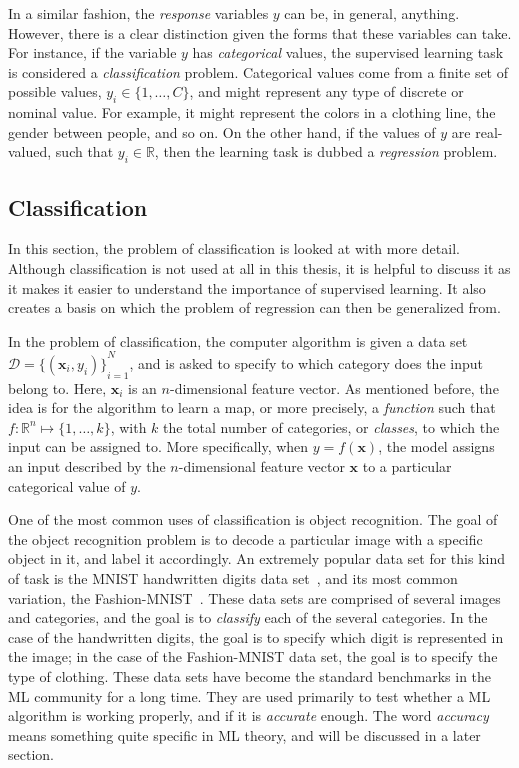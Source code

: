 In a similar fashion, the \emph{response} variables $y$ can be, in general, anything. 
However, there is a clear distinction given the forms that these variables can take. For 
instance, if the variable $y$ has \emph{categorical} values, the supervised learning task 
is considered a \emph{classification} problem. Categorical values come from a finite set of 
possible values, \(y_{i} \in \{1, \dots, C\}\), and might represent any type of discrete or 
nominal value. For example, it might represent the colors in a clothing line, the gender 
between people, and so on. On the other hand, if the values of $y$ are real-valued, such 
that \(y_{i} \in \mathbb{R}\), then the learning task is dubbed a \emph{regression} problem.

\subsection{Classification}
In this section, the problem of classification is looked at with more detail. Although 
classification is not used at all in this thesis, it is helpful to discuss it as it makes
it easier to understand the importance of supervised learning. It also creates a basis on 
which the problem of regression can then be generalized from.

In the problem of classification, the computer algorithm is given a data set \(\mathcal
{D}={ \{(\bm{x}_{i}, y_i)\} }_{i=1}^{N}\), and is asked to specify to which category 
does the input belong to. Here, $\bm{x}_i$ is an $n$-dimensional feature vector. As 
mentioned before, the idea is for the algorithm to learn a map, or more precisely, a \emph
{function} such that $f \colon \mathbb{R}^n \mapsto \{1, \dots, k\}$, with $k$ the total 
number of categories, or \emph{classes}, to which the input can be assigned to. More 
specifically, when $y=f(\bm{x})$, the model assigns an input described by the 
$n$-dimensional feature vector $\bm{x}$ to a particular categorical value of $y$.

One of the most common uses of classification is object recognition. The goal of the object 
recognition problem is to decode a particular image with a specific object in it, and label 
it accordingly. An extremely popular data set for this kind of task is the MNIST 
handwritten digits data set~\cite{lecunGradientbasedLearningApplied1998a}, and its most 
common variation, the Fashion-MNIST~\cite{xiaoFashionMNISTNovelImage2017a}. 
These data sets are 
comprised of several images and categories, and the goal is to \emph{classify} each of the 
several categories. In the case of the handwritten digits, the goal is to specify which 
digit is represented in the image; in the case of the Fashion-MNIST data set, the goal is 
to specify the type of clothing. These data sets have become the standard benchmarks 
in the ML community for a long time. They are used primarily to test whether a ML 
algorithm is working properly, and if it is \emph{accurate} enough. The word 
\emph{accuracy} means something quite specific in ML theory, and will be discussed in a 
later section.

